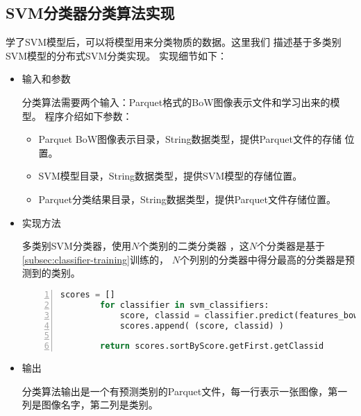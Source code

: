 \subsection{SVM分类器分类算法实现}
\label{subsec:classifier-label}
学了SVM模型后，可以将模型用来分类物质的数据。这里我们
描述基于多类别SVM模型的分布式SVM分类实现。
实现细节如下：
\begin{itemize}
  \item 输入和参数

        分类算法需要两个输入：Parquet格式的BoW图像表示文件和学习出来的模型。
        程序介绍如下参数：
        \begin{itemize}
            \item Parquet BoW图像表示目录，String数据类型，提供Parquet文件的存储
                  位置。
            \item SVM模型目录，String数据类型，提供SVM模型的存储位置。
            \item Parquet分类结果目录，String数据类型，提供Parquet文件存储位置。
        \end{itemize}

  \item 实现方法

        多类别SVM分类器，使用$N$个类别的二类分类器
        ，这$N$个分类器是基于\ref{subsec:classifier-training}训练的，
        $N$个列别的分类器中得分最高的分类器是预测到的类别。
        \begin{lstlisting}[language=Python,
                           basicstyle=\small,
                           numbers=left,
                           showstringspaces=false,
                           caption={SVM多类别分类器分类pseudocode},
                           label={lst:classifier-training}]
        scores = []
        for classifier in svm_classifiers:
            score, classid = classifier.predict(features_bow)
            scores.append( (score, classid) )

        return scores.sortByScore.getFirst.getClassid

        \end{lstlisting}


  \item 输出

        分类算法输出是一个有预测类别的Parquet文件，每一行表示一张图像，第一列是图像名字，第二列是类别。
\end{itemize}





